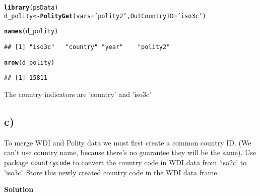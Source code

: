 \documentclass{article}\usepackage[]{graphicx}\usepackage[]{color}
\makeatletter
\newcommand{\hlstr}[1]{\textcolor[rgb]{0.192,0.494,0.8}{#1}}%
\newcommand{\hlstd}[1]{\textcolor[rgb]{0.345,0.345,0.345}{#1}}%
\newcommand{\hlkwb}[1]{\textcolor[rgb]{0.69,0.353,0.396}{#1}}%
\newcommand{\hlkwc}[1]{\textcolor[rgb]{0.333,0.667,0.333}{#1}}%
\newcommand{\hlkwd}[1]{\textcolor[rgb]{0.737,0.353,0.396}{\textbf{#1}}}%
\newenvironment{kframe}{%
 \def\at@end@of@kframe{}%
 \ifinner\ifhmode%
  \def\at@end@of@kframe{\end{minipage}}%
  \begin{minipage}{\columnwidth}%
 \fi\fi%
 \def\FrameCommand##1{\hskip\@totalleftmargin \hskip-\fboxsep
 \colorbox{shadecolor}{##1}\hskip-\fboxsep
     \hskip-\linewidth \hskip-\@totalleftmargin \hskip\columnwidth}%
 \MakeFramed {\advance\hsize-\width
   \@totalleftmargin\z@ \linewidth\hsize
   \@setminipage}}%
 {\par\unskip\endMakeFramed%
 \at@end@of@kframe}
\newenvironment{knitrout}{}{} %
\makeatother
\begin{document}
\begin{knitrout}
\color{fgcolor}\begin{kframe}
\begin{alltt}
\hlkwd{library}\hlstd{(psData)}
\hlstd{d_polity} \hlkwb{<-} \hlkwd{PolityGet}\hlstd{(}\hlkwc{vars} \hlstd{=} \hlstr{'polity2'}\hlstd{,} \hlkwc{OutCountryID} \hlstd{=} \hlstr{'iso3c'}\hlstd{)}
\end{alltt}


{\ttfamily\noindent\itshape\color{messagecolor}{\#\# 577 duplicated values were created when standardising the country ID with iso3c.\\\#\# 749 observations dropped based on missing values of the standardised ID variable.}}\begin{alltt}
\hlkwd{names}\hlstd{(d_polity)}
\end{alltt}
\begin{verbatim}
## [1] "iso3c"   "country" "year"    "polity2"
\end{verbatim}
\begin{alltt}
\hlkwd{nrow}\hlstd{(d_polity)}
\end{alltt}
\begin{verbatim}
## [1] 15811
\end{verbatim}
\end{kframe}
\end{knitrout}

The country indicators are 'country' and 'iso3c'

\subsection*{c)}

To merge WDI and Polity data we must first create a common country ID. (We can't use country name, because there's no guarantee they will be the same). Use package \verb`countrycode` to convert the country code in WDI data from 'iso2c' to 'iso3c'. Store this newly created country code in the WDI data frame.

\textbf{Solution}
\end{document}
